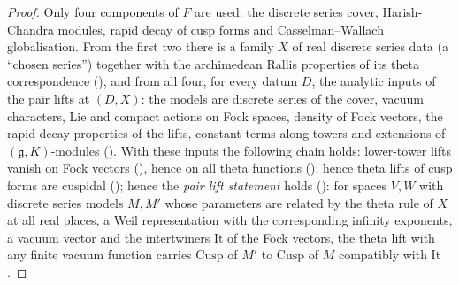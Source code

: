 \begin{proof}
Only four components of $F$ are used: the discrete series cover, Harish-Chandra modules, rapid decay of cusp forms and
Casselman--Wallach globalisation. From the first two there is a family $X$ of real discrete series data (a ``chosen series'')
together with the archimedean Rallis properties of its theta correspondence
(), and from all four, for every datum $D$, the analytic
inputs of the pair lifts at $(D,X)$: the models are discrete series of the cover, vacuum characters, Lie and compact actions on
Fock spaces, density of Fock vectors, the rapid decay properties of the lifts, constant terms along towers and extensions of
$(\mathfrak g,K)$-modules
(). With these inputs the following chain holds:
lower-tower lifts vanish on Fock vectors (), hence on all theta
functions (); hence theta lifts of cusp forms are cuspidal
(); hence the \emph{pair lift statement} holds
(): for spaces $V,W$ with discrete series models $M,M'$ whose
parameters are related by the theta rule of $X$ at all real places, a Weil representation with the corresponding infinity
exponents, a vacuum vector and the intertwiners $\mathrm{It}$ of the Fock vectors, the theta lift with any finite vacuum function
carries $\mathrm{Cusp}$ of $M'$ to $\mathrm{Cusp}$ of $M$ compatibly with $\mathrm{It}$.


\end{proof}
